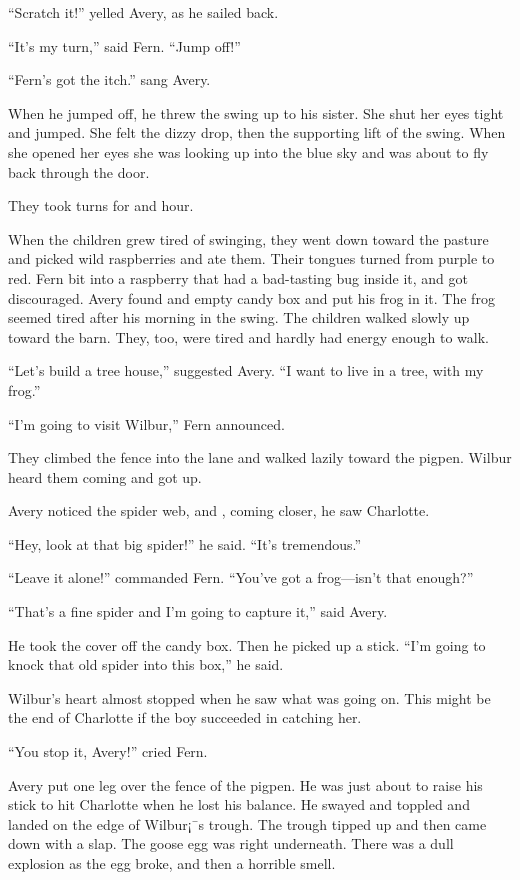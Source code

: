 \documentclass[a4paper, oneside]{book}
\begin{document}
``Scratch it!'' yelled Avery, as he sailed back.

``It's my turn,'' said Fern. ``Jump off!''

``Fern's got the itch.'' sang Avery.

When he jumped off, he threw the swing up to his sister. She
shut her eyes tight and jumped. She felt the dizzy drop, then the
supporting lift of the swing. When she opened her eyes she was
looking up into the blue sky and was about to fly back through the
door.

They took turns for and hour.

When the children grew tired of swinging, they went down
toward the pasture and picked wild raspberries and ate them. Their
tongues turned from purple to red. Fern bit into a raspberry that
had a bad-tasting bug inside it, and got discouraged. Avery found
and empty candy box and put his frog in it. The frog seemed tired
after his morning in the swing. The children walked slowly up
toward the barn. They, too, were tired and hardly had energy
enough to walk.

``Let's build a tree house,'' suggested Avery. ``I want to live in a
tree, with my frog.''

``I'm going to visit Wilbur,'' Fern announced.

They climbed the fence into the lane and walked lazily toward
the pigpen. Wilbur heard them coming and got up.

Avery noticed the spider web, and , coming closer, he saw
Charlotte.

``Hey, look at that big spider!'' he said. ``It's tremendous.''

``Leave it alone!'' commanded Fern. ``You've got a frog---isn't
that enough?''

``That's a fine spider and I'm going to capture it,'' said Avery.

He took the cover off the candy box. Then he picked up a stick. ``I'm
going to knock that old spider into this box,'' he said.

Wilbur's heart almost stopped when he saw what was going on.
This might be the end of Charlotte if the boy succeeded in catching
her.

``You stop it, Avery!'' cried Fern.

Avery put one leg over the fence of the pigpen. He was just
about to raise his stick to hit Charlotte when he lost his balance. He
swayed and toppled and landed on the edge of Wilbur¡¯s trough.
The trough tipped up and then came down with a slap. The goose
egg was right underneath. There was a dull explosion as the egg
broke, and then a horrible smell.
\end{document}
